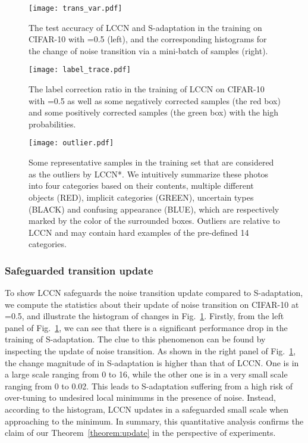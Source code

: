 \documentclass[journal]{IEEEtran}
\begin{document}
\begin{figure} 
\centering
 \texttt{[image: trans\_var.pdf]}
\caption{The test accuracy of LCCN and S-adaptation in the training on CIFAR-10 with =0.5 (left), and the corresponding histograms for the change of noise transition  via a mini-batch of samples (right).}\label{fig:transvar}
\end{figure} 

\begin{figure}
\centering
\texttt{[image: label\_trace.pdf]}
\caption{The label correction ratio in the training of LCCN on CIFAR-10 with =0.5 as well as some negatively corrected samples (the red box) and some positively corrected samples (the green box) with the high probabilities.}
\label{fig:label_trace}
\end{figure}

\begin{figure*}[ht] 
\centering
\texttt{[image: outlier.pdf]}
\caption{Some representative samples in the training set that are considered as the outliers by LCCN*. We intuitively summarize these photos into four categories based on their contents, multiple different objects (RED), implicit categories (GREEN), uncertain types (BLACK) and confusing appearance (BLUE), which are respectively marked by the color of the surrounded boxes. Outliers are relative to LCCN and may contain hard examples of the pre-defined 14 categories.}\label{fig:clothing1M_outlier}
\end{figure*}

\subsubsection{Safeguarded transition update}
To show LCCN safeguards the noise transition update compared to S-adaptation, we compute the statistics about their update of noise transition on CIFAR-10 at =0.5, and illustrate the histogram of changes in Fig.~\ref{fig:transvar}. Firstly, from the left panel of Fig.~\ref{fig:transvar}, we can see that there is a significant performance drop in the training of S-adaptation. The clue to this phenomenon can be found by inspecting the update of noise transition. As shown in the right panel of Fig.~\ref{fig:transvar}, the change magnitude of  in S-adaptation is higher than that of LCCN. One is in a large scale ranging from 0 to 16, while the other one is in a very small scale ranging from 0 to 0.02. This leads to S-adaptation suffering from a high risk of over-tuning to undesired local minimums in the presence of noise. Instead, according to  the histogram, LCCN updates  in a safeguarded small scale when approaching to the minimum. In summary, this quantitative analysis confirms the claim of our Theorem~\ref{theorem:update} in the perspective of experiments.
\end{document}
